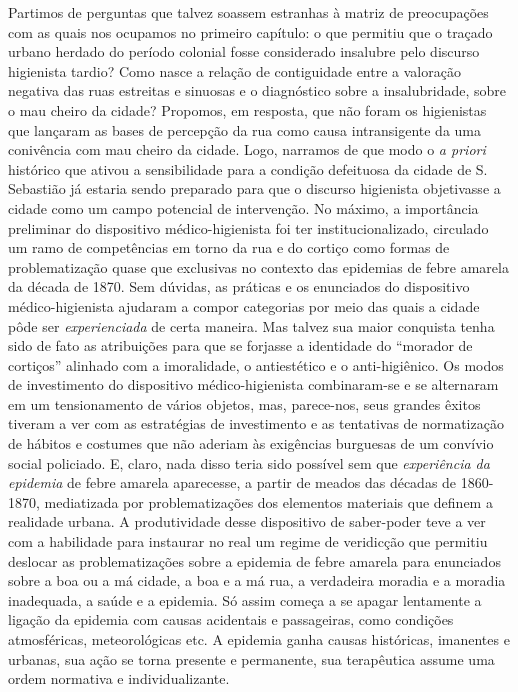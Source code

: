 Partimos de perguntas que talvez soassem estranhas à matriz de
preocupações com as quais nos ocupamos no primeiro capítulo: o que
permitiu que o traçado urbano herdado do período colonial fosse
considerado insalubre pelo discurso higienista tardio? Como nasce a
relação de contiguidade entre a valoração negativa das ruas estreitas e
sinuosas e o diagnóstico sobre a insalubridade, sobre o mau cheiro da
cidade? Propomos, em resposta, que não foram os higienistas que lançaram
as bases de percepção da rua como causa intransigente da uma conivência
com mau cheiro da cidade. Logo, narramos de que modo o \textit{a priori}
histórico que ativou a sensibilidade para a condição defeituosa da
cidade de S. Sebastião já estaria sendo preparado para que o discurso
higienista objetivasse a cidade como um campo potencial de intervenção.
No máximo, a importância preliminar do dispositivo médico-higienista foi
ter institucionalizado, circulado um ramo de competências em torno da
rua e do cortiço como formas de problematização quase que exclusivas no
contexto das epidemias de febre amarela da década de 1870. Sem dúvidas,
as práticas e os enunciados do dispositivo médico-higienista ajudaram a
compor categorias por meio das quais a cidade pôde ser
\textit{experienciada} de certa maneira. Mas talvez sua maior conquista
tenha sido de fato as atribuições para que se forjasse a identidade do
``morador de cortiços'' alinhado com a imoralidade, o antiestético e o
anti-higiênico. Os modos de investimento do dispositivo
médico-higienista combinaram-se e se alternaram em um tensionamento de
vários objetos, mas, parece-nos, seus grandes êxitos tiveram a ver com
as estratégias de investimento e as tentativas de normatização de
hábitos e costumes que não aderiam às exigências burguesas de um
convívio social policiado. E, claro, nada disso teria sido possível sem
que \textit{experiência da epidemia} de febre amarela aparecesse, a partir
de meados das décadas de 1860-1870, mediatizada por problematizações dos
elementos materiais que definem a realidade urbana. A produtividade
desse dispositivo de saber-poder teve a ver com a habilidade para
instaurar no real um regime de veridicção que permitiu deslocar as
problematizações sobre a epidemia de febre amarela para enunciados sobre
a boa ou a má cidade, a boa e a má rua, a verdadeira moradia e a moradia
inadequada, a saúde e a epidemia. Só assim começa a se apagar lentamente
a ligação da epidemia com causas acidentais e passageiras, como
condições atmosféricas, meteorológicas etc. A epidemia ganha causas
históricas, imanentes e urbanas, sua ação se torna presente e
permanente, sua terapêutica assume uma ordem normativa e
individualizante.

